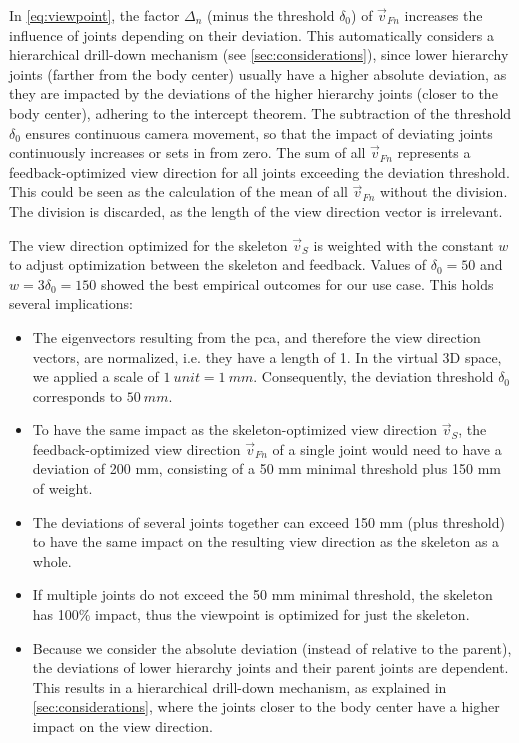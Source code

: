 In \autoref{eq:viewpoint}, the factor \(\Delta_n\) (minus the threshold \(\delta_0\)) of \(\vec{v}_{Fn}\) increases the influence of joints depending on their deviation. This automatically considers a hierarchical drill-down mechanism (see \autoref{sec:considerations}), since lower hierarchy joints (farther from the body center) usually have a higher absolute deviation, as they are impacted by the deviations of the higher hierarchy joints (closer to the body center), adhering to the intercept theorem. The subtraction of the threshold \(\delta_0\) ensures continuous camera movement, so that the impact of deviating joints continuously increases or sets in from zero. The sum of all \(\vec{v}_{Fn}\) represents a feedback-optimized view direction for all joints exceeding the deviation threshold. This could be seen as the calculation of the mean of all \(\vec{v}_{Fn}\) without the division. The division is discarded, as the length of the view direction vector is irrelevant.

The view direction optimized for the skeleton \(\vec{v}_S\) is weighted with the constant \(w\) to adjust optimization between the skeleton and feedback. Values of \(\delta_0 = 50\) and \(w = 3\delta_0 = 150\) showed the best empirical outcomes for our use case. This holds several implications:
\begin{itemize}
	\setlength{\itemsep}{-0.3cm}
	\item The eigenvectors resulting from the \acrshort{pca}, and therefore the view direction vectors, are normalized, i.e. they have a length of 1. In the virtual 3D space, we applied a scale of \(1\ unit = 1\ mm\). Consequently, the deviation threshold \(\delta_0\) corresponds to \(50\ mm\).
	\item To have the same impact as the skeleton-optimized view direction \(\vec{v}_S\), the feedback-optimized view direction \(\vec{v}_{Fn}\) of a single joint would need to have a deviation of 200 mm, consisting of a 50 mm minimal threshold plus 150 mm of weight.
	\item The deviations of several joints together can exceed 150 mm (plus threshold) to have the same impact on the resulting view direction as the skeleton as a whole.
	\item If multiple joints do not exceed the 50 mm minimal threshold, the skeleton has 100\% impact, thus the viewpoint is optimized for just the skeleton.
	\item Because we consider the absolute deviation (instead of relative to the parent), the deviations of lower hierarchy joints and their parent joints are dependent. This results in a hierarchical drill-down mechanism, as explained in \autoref{sec:considerations}, where the joints closer to the body center have a higher impact on the view direction.
\end{itemize}

